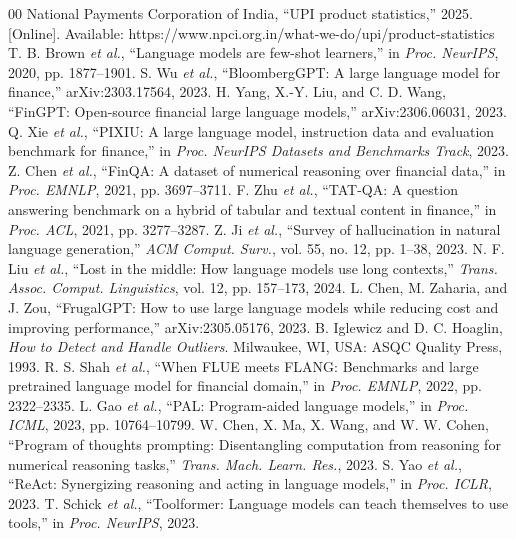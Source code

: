 \documentclass[conference]{IEEEtran}
\begin{document}
\begin{thebibliography}{00}
 National Payments Corporation of India, ``UPI product statistics,'' 2025. [Online]. Available: https://www.npci.org.in/what-we-do/upi/product-statistics
 T. B. Brown \emph{et al.}, ``Language models are few-shot learners,'' in \emph{Proc. NeurIPS}, 2020, pp. 1877--1901.
 S. Wu \emph{et al.}, ``BloombergGPT: A large language model for finance,'' arXiv:2303.17564, 2023.
 H. Yang, X.-Y. Liu, and C. D. Wang, ``FinGPT: Open-source financial large language models,'' arXiv:2306.06031, 2023.
 Q. Xie \emph{et al.}, ``PIXIU: A large language model, instruction data and evaluation benchmark for finance,'' in \emph{Proc. NeurIPS Datasets and Benchmarks Track}, 2023.
 Z. Chen \emph{et al.}, ``FinQA: A dataset of numerical reasoning over financial data,'' in \emph{Proc. EMNLP}, 2021, pp. 3697--3711.
 F. Zhu \emph{et al.}, ``TAT-QA: A question answering benchmark on a hybrid of tabular and textual content in finance,'' in \emph{Proc. ACL}, 2021, pp. 3277--3287.
 Z. Ji \emph{et al.}, ``Survey of hallucination in natural language generation,'' \emph{ACM Comput. Surv.}, vol. 55, no. 12, pp. 1--38, 2023.
 N. F. Liu \emph{et al.}, ``Lost in the middle: How language models use long contexts,'' \emph{Trans. Assoc. Comput. Linguistics}, vol. 12, pp. 157--173, 2024.
 L. Chen, M. Zaharia, and J. Zou, ``FrugalGPT: How to use large language models while reducing cost and improving performance,'' arXiv:2305.05176, 2023.
 B. Iglewicz and D. C. Hoaglin, \emph{How to Detect and Handle Outliers}. Milwaukee, WI, USA: ASQC Quality Press, 1993.
 R. S. Shah \emph{et al.}, ``When FLUE meets FLANG: Benchmarks and large pretrained language model for financial domain,'' in \emph{Proc. EMNLP}, 2022, pp. 2322--2335.
 L. Gao \emph{et al.}, ``PAL: Program-aided language models,'' in \emph{Proc. ICML}, 2023, pp. 10764--10799.
 W. Chen, X. Ma, X. Wang, and W. W. Cohen, ``Program of thoughts prompting: Disentangling computation from reasoning for numerical reasoning tasks,'' \emph{Trans. Mach. Learn. Res.}, 2023.
 S. Yao \emph{et al.}, ``ReAct: Synergizing reasoning and acting in language models,'' in \emph{Proc. ICLR}, 2023.
 T. Schick \emph{et al.}, ``Toolformer: Language models can teach themselves to use tools,'' in \emph{Proc. NeurIPS}, 2023.

\end{thebibliography}
\end{document}
